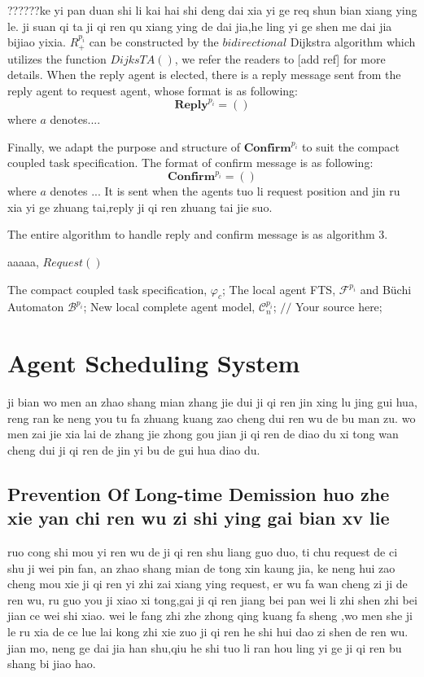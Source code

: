 \documentclass[journal]{IEEEtran}
\begin{document}
??????ke yi pan duan shi li kai hai shi deng dai xia yi ge req shun bian xiang ying le. ji suan qi ta ji qi ren qu xiang ying de dai jia,he ling yi ge shen me dai jia bijiao yixia.
$R^{p_i}_+$ can be constructed by the $bidirectional$ Dijkstra algorithm which utilizes the function $DijksTA()$, we refer the readers to [add ref] for more details. When the reply agent is elected, there is a reply message sent from the reply agent to request agent, whose format is as following:
$$\textbf{Reply}^{p_i}=()$$
where $a$ denotes....\par
Finally, we adapt the purpose and structure of $\textbf{Confirm}^{p_i}$ to suit the compact coupled task specification. The format of confirm message is as following:
$$\textbf{Confirm}^{p_i}=()$$
where $a$ denotes ... It is sent when the agents tuo li request position and jin ru xia yi ge zhuang tai,reply ji qi ren zhuang tai jie suo.

The entire algorithm to handle reply and confirm message is as algorithm 3.
\begin{algorithm}[hc]
  \caption{ aaaaa, $Request()$ }
  \label{alg:Framwork}
  \begin{algorithmic}[1]
    \Require
      The compact coupled task specification, $\varphi_c$;
      The local agent FTS, $\mathcal{F}^{p_i}$ and B\"{u}chi Automaton $\mathcal{B}^{p_i}$;
    \Ensure
      New local complete agent model, $\mathcal{C}^{p_i}_n$;
          \State $//$ Your source here;
        \EndFor
  \end{algorithmic}
\end{algorithm}
\section{Agent Scheduling System}
ji bian wo men an zhao shang mian zhang jie dui ji qi ren jin xing lu jing gui hua, reng ran ke neng you tu fa zhuang kuang zao cheng dui ren wu de bu man zu. wo men zai jie xia lai de zhang jie zhong gou jian ji qi ren de diao du xi tong wan cheng dui ji qi ren de jin yi bu de gui hua diao du.
\subsection{Prevention Of Long-time Demission huo zhe xie yan chi ren wu zi shi ying gai bian xv lie}
ruo cong shi mou yi ren wu de ji qi ren shu liang guo duo, ti chu request de ci shu ji wei pin fan, an zhao shang mian de tong xin kaung jia, ke neng hui zao cheng mou xie ji qi ren yi zhi zai xiang ying request, er wu fa wan cheng zi ji de ren wu, ru guo you ji xiao xi tong,gai ji qi ren jiang bei pan wei li zhi shen zhi bei jian ce wei shi xiao. wei le fang zhi zhe zhong qing kuang fa sheng ,wo men she ji le ru xia de ce lue lai kong zhi xie zuo ji qi ren he shi hui dao zi shen de ren wu.   jian mo, neng ge dai jia han shu,qiu he shi tuo li ran hou ling yi ge ji qi ren bu shang bi jiao hao.
\end{document}
